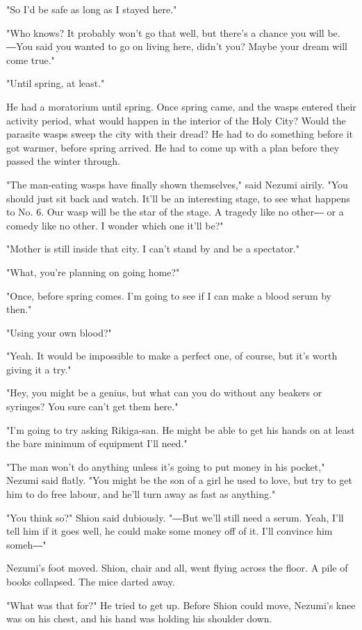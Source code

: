 "So I'd be safe as long as I stayed here."

"Who knows? It probably won't go that well, but there's a chance you
will be. ―You said you wanted to go on living here, didn't you? Maybe
your dream will come true."

"Until spring, at least."

He had a moratorium until spring. Once spring came, and the wasps
entered their activity period, what would happen in the interior of the
Holy City? Would the parasite wasps sweep the city with their dread? He
had to do something before it got warmer, before spring arrived. He had
to come up with a plan before they passed the winter through.

"The man-eating wasps have finally shown themselves," said Nezumi
airily. "You should just sit back and watch. It'll be an interesting
stage, to see what happens to No. 6. Our wasp will be the star of the
stage. A tragedy like no other― or a comedy like no other. I wonder
which one it'll be?"

"Mother is still inside that city. I can't stand by and be a spectator."

"What, you're planning on going home?"

"Once, before spring comes. I'm going to see if I can make a blood serum
by then."

"Using your own blood?"

"Yeah. It would be impossible to make a perfect one, of course, but it's
worth giving it a try."

"Hey, you might be a genius, but what can you do without any beakers or
syringes? You sure can't get them here."

"I'm going to try asking Rikiga-san. He might be able to get his hands
on at least the bare minimum of equipment I'll need."

"The man won't do anything unless it's going to put money in his
pocket," Nezumi said flatly. "You might be the son of a girl he used to
love, but try to get him to do free labour, and he'll turn away as fast
as anything."

"You think so?" Shion said dubiously. "―But we'll still need a serum.
Yeah, I'll tell him if it goes well, he could make some money off of it.
I'll convince him someh―"

Nezumi's foot moved. Shion, chair and all, went flying across the floor.
A pile of books collapsed. The mice darted away.

"What was that for?" He tried to get up. Before Shion could move,
Nezumi's knee was on his chest, and his hand was holding his shoulder
down.

